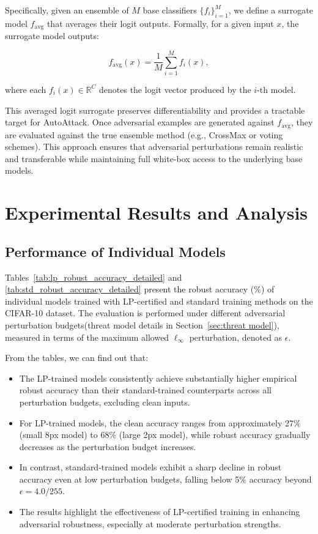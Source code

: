 Specifically, given an ensemble of $M$ base classifiers $\{f_i\}_{i=1}^M$, we define a surrogate model $f_{\text{avg}}$ that averages their logit outputs. Formally, for a given input $x$, the surrogate model outputs:

\begin{equation}
f_{\text{avg}}(x) = \frac{1}{M} \sum_{i=1}^M f_i(x),
\end{equation}

\noindent where each $f_i(x) \in \mathbb{R}^C$ denotes the logit vector produced by the $i$-th model.

This averaged logit surrogate preserves differentiability and provides a tractable target for AutoAttack. Once adversarial examples are generated against $f_{\text{avg}}$, they are evaluated against the true ensemble method (e.g., CrossMax or voting schemes). This approach ensures that adversarial perturbations remain realistic and transferable while maintaining full white-box access to the underlying base models.

\section{Experimental Results and Analysis}

\subsection{Performance of Individual Models}
\indent

Tables~\ref{tab:lp_robust_accuracy_detailed} and \ref{tab:std_robust_accuracy_detailed} present the robust accuracy (\%) of individual models trained with LP-certified and standard training methods on the CIFAR-10 dataset. The evaluation is performed under different adversarial perturbation budgets(threat model details in Section~\ref{sec:threat model}), measured in terms of the maximum allowed $\ell_\infty$ perturbation, denoted as $\epsilon$.

From the tables, we can find out that:

\begin{itemize}
  \item The LP-trained models consistently achieve substantially higher empirical robust accuracy than their standard-trained counterparts across all perturbation budgets, excluding clean inputs.
  \item For LP-trained models, the clean accuracy ranges from approximately 27\% (small 8px model) to 68\% (large 2px model), while robust accuracy gradually decreases as the perturbation budget increases.
  \item In contrast, standard-trained models exhibit a sharp decline in robust accuracy even at low perturbation budgets, falling below 5\% accuracy beyond $\epsilon = 4.0/255$.
  \item The results highlight the effectiveness of LP-certified training in enhancing adversarial robustness, especially at moderate perturbation strengths.
\end{itemize}

